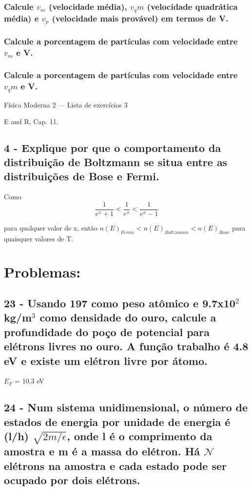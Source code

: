 \documentclass{article}
\begin{document}
\subsubsection{Calcule $v_m$ (velocidade média), $v_qm$ (velocidade quadrática média) e $v_p$ (velocidade mais provável) em termos de V.
}
\subsubsection{Calcule a porcentagem de partículas com velocidade entre $v_m$ e V.
}
\subsubsection{Calcule a porcentagem de partículas com velocidade entre $v_qm$ e V.
}
Física Moderna 2 — Lista de exercícios 3

E and R, Cap. 11.
\subsection{4 - Explique por que o comportamento da distribuição de Boltzmann se situa entre as distribuições de Bose e Fermi.}

Como 
\begin{equation}
    \frac{1}{e^{x}+1}<\frac{1}{e^{x}}<\frac{1}{e^{x}-1}
\end{equation}

para qualquer valor de x, então $n(E)_{Fermi} < n(E)_{Boltzmann} < n(E)_{Bose}$
para quaisquer valores de T.


\section{Problemas:}
\subsection{23 - Usando 197 como peso atômico e 9.7x10$^2$ kg/m$^3$ como densidade do ouro, calcule a profundidade do poço de potencial para elétrons livres no ouro. A função trabalho é 4.8 eV e existe um elétron livre por átomo.}
$E_F$ = 10.3 eV

\subsection{24 - Num sistema unidimensional, o número de estados de energia por unidade de energia é (l/h) $\sqrt{2m/\epsilon}$, onde l é o comprimento da amostra e m é a massa do elétron. Há $\mathcal{N}$ elétrons na amostra e cada estado pode ser ocupado por dois elétrons.}
\end{document}
